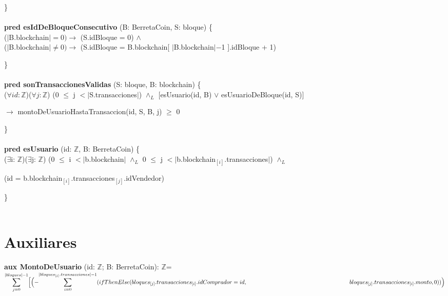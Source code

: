 \documentclass{article}
\newcommand{\Entero}{$\mathds{Z}$}
\begin{document}
    \}\\\\

    \textbf{pred esIdDeBloqueConsecutivo} (B: BerretaCoin, S: bloque) \{\\
        \indent\indent ($|$B.blockchain$| = 0)\rightarrow$ (S.idBloque = 0) $\land$\\
        \indent\indent ($|$B.blockchain$| \ne 0) \rightarrow$ (S.idBloque = B.blockchain[ $|$B.blockchain$|-$1 ].idBloque + 1)

    \}\\\\

    \textbf{pred sonTransaccionesValidas} (S: bloque, B: blockchain) \{\\
        \indent\indent ($\forall id:$\Entero)($\forall j:$\Entero) (0 $\le$ j $<|$S.transacciones$|$) $\land_{L}$ [esUsuario(id, B) $\lor$ esUsuarioDeBloque(id, S)]
        
        \indent\indent\indent\indent\indent\indent\indent $\rightarrow$ montoDeUsuarioHastaTransaccion(id, S, B, j) $\ge$ 0

    \}\\\\

    \textbf{pred esUsuario} (id: \Entero, B: BerretaCoin) \{\\
        \indent\indent($\exists$i: \Entero)($\exists$j: \Entero) (0 $\leq$ i $< |$b.blockchain$|$ $\land_{L}$ 0 $\le$ j $< |$b.blockchain$_{[i]}$.transacciones$|$) $\land_{L}$

        \indent\indent(id = b.blockchain$_{[i]}$.transacciones$_{[j]}$.idVendedor)

    \}\\\\











\newpage
\section*{Auxiliares}

    \textbf{aux MontoDeUsuario} (id: \Entero; B: BerretaCoin): \Entero =\\

        \indent\indent
        $\mathlarger\sum\limits_{j=0}^{|bloques| - 1}
        \Bigl[\Bigl(-\mathlarger\sum\limits_{i=0}^{|bloques_{[j]}.transacciones|-1} (ifThenElse (bloques_{[j]}.transacciones_{[i]}.idComprador = id,\\
        \indent\indent\indent\indent\indent\indent\indent\indent\indent\indent\indent\indent bloques_{[j]}.transacciones_{[i]}.monto, 0))\Bigr)$ \\
\end{document}
